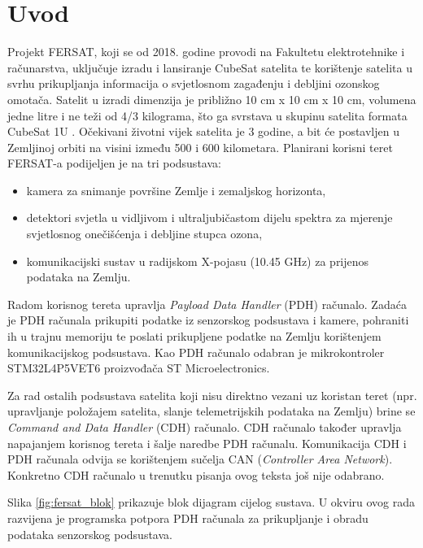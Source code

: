 \chapter{Uvod}
    Projekt FERSAT, koji se od 2018. godine provodi na Fakultetu elektrotehnike i računarstva, uključuje izradu i lansiranje CubeSat satelita te korištenje satelita u svrhu prikupljanja informacija o svjetlosnom zagađenju i debljini ozonskog omotača. Satelit u izradi dimenzija je približno 10 cm x 10 cm x 10 cm, volumena jedne litre i ne teži od 4/3 kilograma, što ga svrstava u skupinu satelita formata CubeSat 1U \cite{fersat_stranica_projekta}. Očekivani životni vijek satelita je 3 godine, a bit će postavljen u Zemljinoj orbiti na visini između 500 i 600 kilometara. Planirani korisni teret  FERSAT-a podijeljen je na tri podsustava:

    \begin{itemize}
        \item kamera za snimanje površine Zemlje i zemaljskog horizonta,
        \item detektori svjetla u vidljivom i ultraljubičastom dijelu spektra za mjerenje svjetlosnog onečišćenja i debljine stupca ozona,
        \item komunikacijski sustav u radijskom X-pojasu (10.45 GHz) za prijenos podataka na Zemlju.
    \end{itemize}

    Radom korisnog tereta upravlja \textit{Payload Data Handler} (PDH) računalo. Zadaća je PDH računala prikupiti podatke iz senzorskog podsustava i kamere, pohraniti ih u trajnu memoriju  te poslati prikupljene podatke na Zemlju korištenjem komunikacijskog podsustava. Kao PDH računalo odabran je mikrokontroler STM32L4P5VET6 proizvođača ST Microelectronics.

    Za rad ostalih podsustava satelita koji nisu direktno vezani uz koristan teret (npr. upravljanje položajem satelita, slanje telemetrijskih podataka na Zemlju) brine se \textit{Command and Data Handler} (CDH) računalo. CDH računalo također upravlja napajanjem korisnog tereta i šalje naredbe PDH računalu. Komunikacija CDH i PDH računala odvija se korištenjem sučelja CAN (\textit{Controller Area Network}). Konkretno CDH računalo u trenutku pisanja ovog teksta još nije odabrano.

    Slika \ref{fig:fersat_blok} prikazuje blok dijagram cijelog sustava. U okviru ovog rada razvijena je programska potpora PDH računala za prikupljanje i obradu podataka senzorskog podsustava.
    
